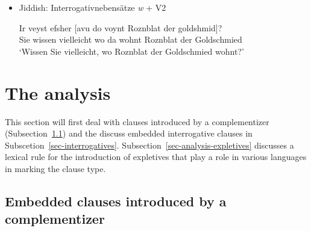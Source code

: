\begin{itemize}
\item Jiddish: Interrogativnebensätze \emph{w} + V2 \citep[Abschnitte~4.1, 4.2]{Diesing90a}




\ea
\gll Ir veyst efsher [avu            do    voynt Roznblat   der goldshmid]?\footnotemark\\
     Sie wissen vielleicht  \spacebr{}wo da wohnt Roznblat der Goldschmied\\
\glt `Wissen Sie vielleicht, wo Roznblat der Goldschmied wohnt?' 
\z
\end{itemize}

\fi

\section{The analysis}

This section will first deal with clauses introduced by a complementizer
(Subsection~\ref{sec-embedded-cp}) and the discuss embedded interrogative clauses in
Subscetion~\ref{sec-interrogatives}. Subsection~\ref{sec-analysis-expletives} discusses a lexical rule for
the introduction of expletives that play a role in various languages in marking the clause type.

\subsection{Embedded clauses introduced by a complementizer}
\label{sec-embedded-cp}


